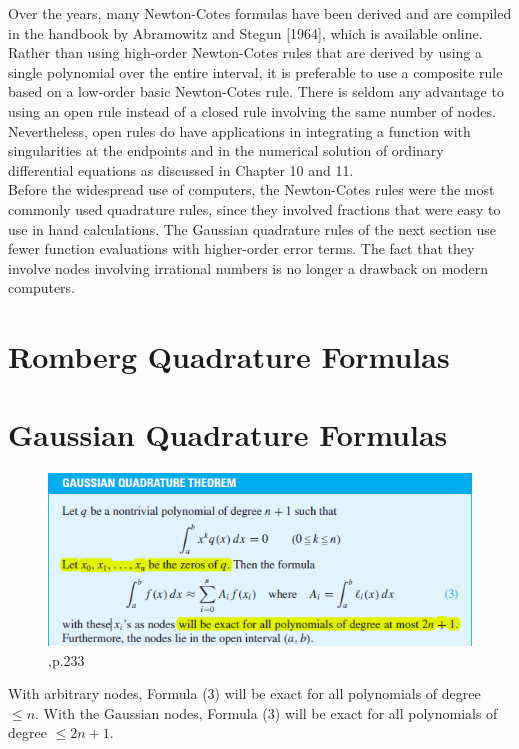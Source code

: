 \documentclass[12pt]{article}
\theoremstyle{theorem}
\begin{document}
Over the years, many Newton-Cotes formulas have been derived and are compiled in
the handbook by Abramowitz and Stegun [1964], which is available online. Rather than
using high-order Newton-Cotes rules that are derived by using a single polynomial over
the entire interval, it is preferable to use a composite rule based on a low-order basic
Newton-Cotes rule. There is seldom any advantage to using an open rule instead of a closed
rule involving the same number of nodes. Nevertheless, open rules do have applications in
integrating a function with singularities at the endpoints and in the numerical solution of
ordinary differential equations as discussed in Chapter 10 and 11.\\
Before the widespread use of computers, the Newton-Cotes rules were the most commonly
used quadrature rules, since they involved fractions that were easy to use in hand
calculations. The Gaussian quadrature rules of the next section use fewer function evaluations
with higher-order error terms. The fact that they involve nodes involving irrational
numbers is no longer a drawback on modern computers.

\cleardoublepage 

\section{Romberg Quadrature Formulas}

\cleardoublepage

\section{Gaussian Quadrature Formulas}

\begin{figure}[h!]
	\centering
	\includegraphics[scale=1.0]{Figures/46}
	\caption{\cite{CheK07},p.233}
	\label{fig:46}
\end{figure}

\begin{shaded}
With arbitrary nodes, Formula (3) will be exact for all polynomials of degree $\leq n$. With the Gaussian nodes, Formula (3) will be exact for all polynomials of
degree $\leq 2n + 1$.
\end{shaded}
\end{document}
